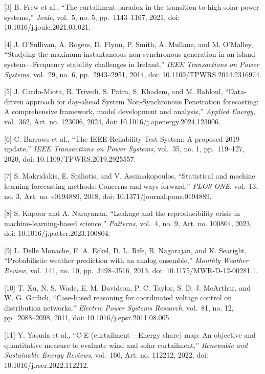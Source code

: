 \documentclass[
  10pt,
  a4paper,
]{article}
\begin{document}
{[}3{]} B. Frew et al., ``The curtailment paradox in the transition to
high solar power systems,'' \emph{Joule}, vol.~5, no. 5, pp.~1143--1167,
2021, doi: 10.1016/j.joule.2021.03.021.

{[}4{]} J. O'Sullivan, A. Rogers, D. Flynn, P. Smith, A. Mullane, and M.
O'Malley, ``Studying the maximum instantaneous non-synchronous
generation in an island system---Frequency stability challenges in
Ireland,'' \emph{IEEE Transactions on Power Systems}, vol.~29, no. 6,
pp.~2943--2951, 2014, doi: 10.1109/TPWRS.2014.2316974.

{[}5{]} J. Cardo-Miota, R. Trivedi, S. Patra, S. Khadem, and M. Bahloul,
``Data-driven approach for day-ahead System Non-Synchronous Penetration
forecasting: A comprehensive framework, model development and
analysis,'' \emph{Applied Energy}, vol.~362, Art. no. 123006, 2024, doi:
10.1016/j.apenergy.2024.123006.

{[}6{]} C. Barrows et al., ``The IEEE Reliability Test System: A
proposed 2019 update,'' \emph{IEEE Transactions on Power Systems},
vol.~35, no. 1, pp.~119--127, 2020, doi: 10.1109/TPWRS.2019.2925557.

{[}7{]} S. Makridakis, E. Spiliotis, and V. Assimakopoulos,
``Statistical and machine learning forecasting methods: Concerns and
ways forward,'' \emph{PLOS ONE}, vol.~13, no. 3, Art. no. e0194889,
2018, doi: 10.1371/journal.pone.0194889.

{[}8{]} S. Kapoor and A. Narayanan, ``Leakage and the reproducibility
crisis in machine-learning-based science,'' \emph{Patterns}, vol.~4, no.
9, Art. no. 100804, 2023, doi: 10.1016/j.patter.2023.100804.

{[}9{]} L. Delle Monache, F. A. Eckel, D. L. Rife, B. Nagarajan, and K.
Searight, ``Probabilistic weather prediction with an analog ensemble,''
\emph{Monthly Weather Review}, vol.~141, no. 10, pp.~3498--3516, 2013,
doi: 10.1175/MWR-D-12-00281.1.

{[}10{]} T. Xu, N. S. Wade, E. M. Davidson, P. C. Taylor, S. D. J.
McArthur, and W. G. Garlick, ``Case-based reasoning for coordinated
voltage control on distribution networks,'' \emph{Electric Power Systems
Research}, vol.~81, no. 12, pp.~2088--2098, 2011, doi:
10.1016/j.epsr.2011.08.005.

{[}11{]} Y. Yasuda et al., ``C-E (curtailment -- Energy share) map: An
objective and quantitative measure to evaluate wind and solar
curtailment,'' \emph{Renewable and Sustainable Energy Reviews},
vol.~160, Art. no. 112212, 2022, doi: 10.1016/j.rser.2022.112212.
\end{document}
